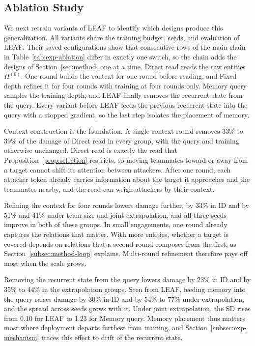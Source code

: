 \subsection{Ablation Study}
\label{subsec:exp-ablation}

We next retrain variants of LEAF to identify which designs produce this generalization. All variants share the training budget, seeds, and evaluation of LEAF. Their saved configurations show that consecutive rows of the main chain in Table~\ref{tab:exp-ablation} differ in exactly one switch, so the chain adds the designs of Section~\ref{sec:method} one at a time. Direct read reads the raw entities $H^{(0)}$. One round builds the context for one round before reading, and Fixed depth refines it for four rounds with training at four rounds only. Memory query samples the training depth, and LEAF finally removes the recurrent state from the query. Every variant before LEAF feeds the previous recurrent state into the query with a stopped gradient, so the last step isolates the placement of memory.

Context construction is the foundation. A single context round removes 33\% to 39\% of the damage of Direct read in every group, with the query and training otherwise unchanged. Direct read is exactly the read that Proposition~\ref{prop:selection} restricts, so moving teammates toward or away from a target cannot shift its attention between attackers. After one round, each attacker token already carries information about the target it approaches and the teammates nearby, and the read can weigh attackers by their context.

Refining the context for four rounds lowers damage further, by 33\% in ID and by 51\% and 41\% under team-size and joint extrapolation, and all three seeds improve in both of these groups. In small engagements, one round already captures the relations that matter. With more entities, whether a target is covered depends on relations that a second round composes from the first, as Section~\ref{subsec:method-loop} explains. Multi-round refinement therefore pays off most when the scale grows.

Removing the recurrent state from the query lowers damage by 23\% in ID and by 35\% to 44\% in the extrapolation groups. Seen from LEAF, feeding memory into the query raises damage by 30\% in ID and by 54\% to 77\% under extrapolation, and the spread across seeds grows with it. Under joint extrapolation, the SD rises from 0.10 for LEAF to 1.23 for Memory query. Memory placement thus matters most where deployment departs furthest from training, and Section~\ref{subsec:exp-mechanism} traces this effect to drift of the recurrent state.

